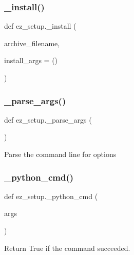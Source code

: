 \subsubsection{\texorpdfstring{\+\_\+install()}{\_install()}}
{\footnotesize\ttfamily def ez\+\_\+setup.\+\_\+install (\begin{DoxyParamCaption}\item[{}]{archive\+\_\+filename,  }\item[{}]{install\+\_\+args = {\ttfamily ()} }\end{DoxyParamCaption})\hspace{0.3cm}{\ttfamily [private]}}

\mbox{\label{namespaceez__setup_a8f215e2844706ec1c7ff6295f91cc0b1}} 
\subsubsection{\texorpdfstring{\+\_\+parse\+\_\+args()}{\_parse\_args()}}
{\footnotesize\ttfamily def ez\+\_\+setup.\+\_\+parse\+\_\+args (\begin{DoxyParamCaption}{ }\end{DoxyParamCaption})\hspace{0.3cm}{\ttfamily [private]}}

\begin{DoxyVerb}Parse the command line for options
\end{DoxyVerb}
 \mbox{\label{namespaceez__setup_ab8fd3a64bf5c7da757276b05644311a2}} 
\subsubsection{\texorpdfstring{\+\_\+python\+\_\+cmd()}{\_python\_cmd()}}
{\footnotesize\ttfamily def ez\+\_\+setup.\+\_\+python\+\_\+cmd (\begin{DoxyParamCaption}\item[{}]{args }\end{DoxyParamCaption})\hspace{0.3cm}{\ttfamily [private]}}

\begin{DoxyVerb}Return True if the command succeeded.
\end{DoxyVerb}
 \mbox{\label{namespaceez__setup_aa735e505d85a6882c1ecc07850dfe0b5}} 

